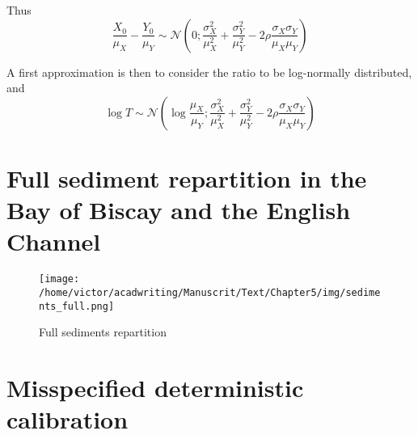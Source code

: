 \documentclass[../../Main_ManuscritThese.tex]{subfiles}
\begin{document}
  Thus
  \begin{equation}
    \frac{X_0}{\mu_X} - \frac{Y_0}{\mu_Y} \sim \mathcal{N}\left(0;\frac{\sigma^2_X}{\mu_X^2} + \frac{\sigma^2_Y}{\mu_Y^2} - 2 \rho \frac{\sigma_X \sigma_Y}{\mu_X \mu_Y} \right)
  \end{equation}
  
  A first approximation is then to consider the ratio to be log-normally distributed, and
  \begin{equation}
    \log T \sim \mathcal{N}\left(\log \frac{\mu_X}{\mu_Y}; \frac{\sigma^2_X}{\mu_X^2} + \frac{\sigma^2_Y}{\mu_Y^2} - 2 \rho \frac{\sigma_X \sigma_Y}{\mu_X \mu_Y} \right)
  \end{equation}
  


\newpage
\section{Full sediment repartition in the Bay of Biscay and the English Channel}
 \label{sec:sediments_full}
\begin{figure}[ht]
  \centering
  \texttt{[image: /home/victor/acadwriting/Manuscrit/Text/Chapter5/img/sediments\_full.png]}
  \caption{\label{fig:sediments_full} Full sediments repartition}
\end{figure}
\clearpage
\section{Misspecified deterministic calibration}
\clearpage
\end{document}
